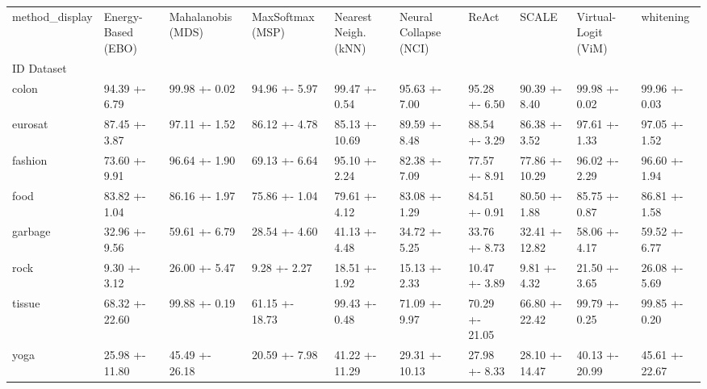 \begin{tabular}{llllllllll}
\toprule
method_display & Energy-Based (EBO) & Mahalanobis (MDS) & MaxSoftmax (MSP) & Nearest Neigh. (kNN) & Neural Collapse (NCI) & ReAct & SCALE & Virtual-Logit (ViM) & whitening \\
ID Dataset &  &  &  &  &  &  &  &  &  \\
\midrule
colon & 94.39 +- 6.79 & 99.98 +- 0.02 & 94.96 +- 5.97 & 99.47 +- 0.54 & 95.63 +- 7.00 & 95.28 +- 6.50 & 90.39 +- 8.40 & 99.98 +- 0.02 & 99.96 +- 0.03 \\
eurosat & 87.45 +- 3.87 & 97.11 +- 1.52 & 86.12 +- 4.78 & 85.13 +- 10.69 & 89.59 +- 8.48 & 88.54 +- 3.29 & 86.38 +- 3.52 & 97.61 +- 1.33 & 97.05 +- 1.52 \\
fashion & 73.60 +- 9.91 & 96.64 +- 1.90 & 69.13 +- 6.64 & 95.10 +- 2.24 & 82.38 +- 7.09 & 77.57 +- 8.91 & 77.86 +- 10.29 & 96.02 +- 2.29 & 96.60 +- 1.94 \\
food & 83.82 +- 1.04 & 86.16 +- 1.97 & 75.86 +- 1.04 & 79.61 +- 4.12 & 83.08 +- 1.29 & 84.51 +- 0.91 & 80.50 +- 1.88 & 85.75 +- 0.87 & 86.81 +- 1.58 \\
garbage & 32.96 +- 9.56 & 59.61 +- 6.79 & 28.54 +- 4.60 & 41.13 +- 4.48 & 34.72 +- 5.25 & 33.76 +- 8.73 & 32.41 +- 12.82 & 58.06 +- 4.17 & 59.52 +- 6.77 \\
rock & 9.30 +- 3.12 & 26.00 +- 5.47 & 9.28 +- 2.27 & 18.51 +- 1.92 & 15.13 +- 2.33 & 10.47 +- 3.89 & 9.81 +- 4.32 & 21.50 +- 3.65 & 26.08 +- 5.69 \\
tissue & 68.32 +- 22.60 & 99.88 +- 0.19 & 61.15 +- 18.73 & 99.43 +- 0.48 & 71.09 +- 9.97 & 70.29 +- 21.05 & 66.80 +- 22.42 & 99.79 +- 0.25 & 99.85 +- 0.20 \\
yoga & 25.98 +- 11.80 & 45.49 +- 26.18 & 20.59 +- 7.98 & 41.22 +- 11.29 & 29.31 +- 10.13 & 27.98 +- 8.33 & 28.10 +- 14.47 & 40.13 +- 20.99 & 45.61 +- 22.67 \\
\bottomrule
\end{tabular}

